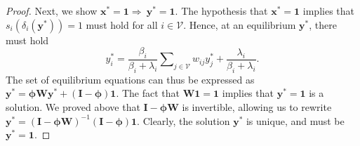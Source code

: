 \documentclass[letterpaper, 10 pt, conference]{ieeeconf}  %
\newcommand{\vect}[1]{\boldsymbol{#1}}
\newcommand{\mat}[1]{\boldsymbol{#1}}
\newtheorem{proposition}{Proposition}
\renewcommand{\eqref}[1]{Eq.~(\ref{#1})}  %
\begin{document}
\begin{proof}
    Next, we show $\vect{x}^*= \vect{1} \Rightarrow~\vect{y}^*=\vect{1}$. The hypothesis that $\vect x^* = \vect 1$ implies that $s_i(\delta_i(\vect y^*))=1$ must hold for all $i \in \mathcal{V}$. 
    Hence, at an equilibrium $\vect{y}^*$, there must hold
    \begin{equation}
        y_i^* = \dfrac{\beta_i}{\beta_i+\lambda_i}\sum\nolimits_{j\in\mathcal{V}}w_{ij}y_j^* + \dfrac{\lambda_i}{\beta_i+\lambda_i}.
    \end{equation}
    The set of equilibrium equations can thus be expressed as $\vect{y}^* = \mat{\phi}\mat{W}\vect{y}^* + (\mat{I} - \mat{\phi})\vect 1$. 
    The fact that $\mat W\vect 1 = \vect 1$ implies that $\vect y^* = \vect 1$ is a solution. We proved above that $\mat I - \mat{\phi W}$ is invertible, allowing us to rewrite $\vect y^* = (\mat I - \mat{\phi W})^{-1}(\mat{I} - \mat{\phi})\vect 1$. Clearly, the solution $\vect y^*$ is unique, and must be $\vect y^* = \vect 1$.
\end{proof}

\end{document}
